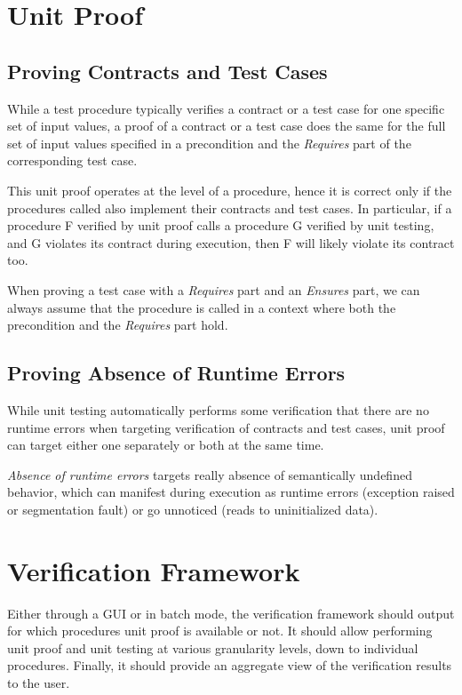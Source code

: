 \documentclass{article}
\begin{document}
\section{Unit Proof}

\subsection{Proving Contracts and Test Cases}

While a test procedure typically verifies a contract or a test case for one
specific set of input values, a proof of a contract or a test case does the
same for the full set of input values specified in a precondition and the
\textit{Requires} part of the corresponding test case.

This unit proof operates at the level of a procedure, hence it is correct only
if the procedures called also implement their contracts and test cases. In
particular, if a procedure F verified by unit proof calls a procedure G
verified by unit testing, and G violates its contract during execution, then F
will likely violate its contract too.

When proving a test case with a \textit{Requires} part and an \textit{Ensures}
part, we can always assume that the procedure is called in a context where
both the precondition and the \textit{Requires} part hold.

\subsection{Proving Absence of Runtime Errors}

While unit testing automatically performs some verification that there are no
runtime errors when targeting verification of contracts and test cases, unit
proof can target either one separately or both at the same time.

\textit{Absence of runtime errors} targets really absence of semantically
undefined behavior, which can manifest during execution as runtime errors
(exception raised or segmentation fault) or go unnoticed (reads to
uninitialized data).

\section{Verification Framework}

Either through a GUI or in batch mode, the verification framework should output
for which procedures unit proof is available or not. It should allow
performing unit proof and unit testing at various granularity levels, down to
individual procedures. Finally, it should provide an aggregate view of the
verification results to the user.
\end{document}
